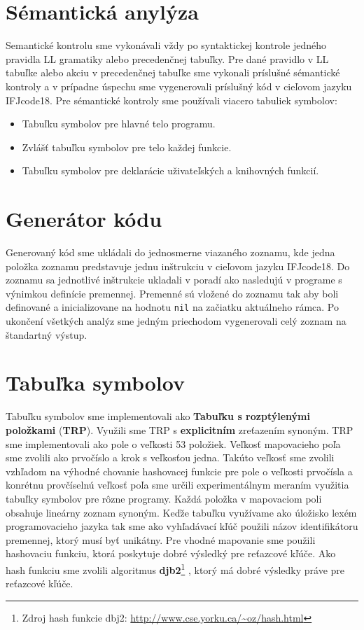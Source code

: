 \documentclass[a4paper, 11pt]{article}
\begin{document}
\section{Sémantická anylýza}
Semantické kontrolu sme vykonávali vždy po syntaktickej kontrole jedného pravidla LL gramatiky alebo precedenčnej tabuľky. Pre dané pravidlo v LL tabuľke alebo akciu v precedenčnej tabuľke sme vykonali príslušné sémantické kontroly a v prípadne úspechu sme vygenerovali príslušný kód v cieľovom jazyku IFJcode18. Pre sémantické kontroly sme používali viacero tabuliek symbolov:
\begin{itemize}
	\item Tabuľku symbolov pre hlavné telo programu.
	\item Zvlášť tabuľku symbolov pre telo každej funkcie.
	\item Tabuľku symbolov pre deklarácie uživateľských a knihovných funkcií.
\end{itemize}

\section{Generátor kódu}
Generovaný kód sme ukládali do jednosmerne viazaného zoznamu, kde jedna položka zoznamu predstavuje jednu inštrukciu v cieľovom jazyku IFJcode18. Do zoznamu sa jednotlivé inštrukcie ukladali v poradí ako nasledujú v programe s výnimkou definície premennej. Premenné sú vložené do zoznamu tak aby boli definované a inicializovane na hodnotu \texttt{nil} na začiatku aktuálneho rámca. Po ukončení všetkých analýz sme jedným priechodom vygenerovali celý zoznam na štandartný výstup.
\section{Tabuľka symbolov}
Tabuľku symbolov sme implementovali ako \textbf{Tabuľku s rozptýlenými položkami} (\textbf{TRP}). Využili sme TRP s \textbf{explicitním} zreťazením synoným. TRP sme implementovali ako pole o veľkosti 53 položiek. Veľkosť mapovacieho poľa sme zvolili ako prvočíslo a krok s veľkosťou jedna. Takúto veľkosť sme zvolili vzhľadom na výhodné chovanie hashovacej funkcie pre pole o veľkosti prvočísla a konrétnu provčíselnú veľkosť poľa sme určili experimentálnym meraním využitia tabuľky symbolov pre rôzne programy. Každá položka v mapovaciom poli obsahuje lineárny zoznam synoným. Keďže tabuľku využívame ako úložisko lexém programovacieho jazyka tak sme ako vyhľadávací kľúč použili názov identifikátoru premennej, ktorý musí byť unikátny. Pre vhodné mapovanie sme použili hashovaciu funkciu, ktorá poskytuje dobré výsledký pre reťazcové kľúče. Ako hash funkciu sme zvolili algoritmus \textbf{djb2}\footnote{Zdroj hash funkcie dbj2: 
	\url{http://www.cse.yorku.ca/~oz/hash.html}}
, ktorý má dobré výsledky práve pre reťazcové kľúče.
\end{document}

